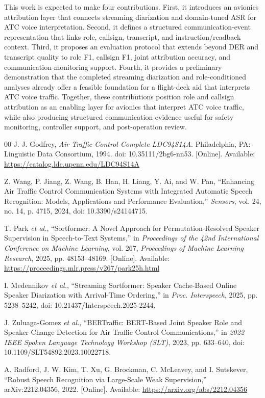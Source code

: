 \documentclass[10pt]{article}
\begin{document}
This work is expected to make four contributions. First, it introduces an avionics attribution layer that connects streaming diarization and domain-tuned ASR for ATC voice interpretation. Second, it defines a structured communication-event representation that links role, callsign, transcript, and instruction/readback context. Third, it proposes an evaluation protocol that extends beyond DER and transcript quality to role F1, callsign F1, joint attribution accuracy, and communication-monitoring support. Fourth, it provides a preliminary demonstration that the completed streaming diarization and role-conditioned analyses already offer a feasible foundation for a flight-deck aid that interprets ATC voice traffic. Together, these contributions position role and callsign attribution as an enabling layer for avionics that interpret ATC voice traffic, while also producing structured communication evidence useful for safety monitoring, controller support, and post-operation review.

\begingroup
\small
\begin{thebibliography}{00}
J. J. Godfrey, \emph{Air Traffic Control Complete LDC94S14A}. Philadelphia, PA: Linguistic Data Consortium, 1994. doi: 10.35111/2bg6-nn53. [Online]. Available: \url{https://catalog.ldc.upenn.edu/LDC94S14A}

Z. Wang, P. Jiang, Z. Wang, B. Han, H. Liang, Y. Ai, and W. Pan, ``Enhancing Air Traffic Control Communication Systems with Integrated Automatic Speech Recognition: Models, Applications and Performance Evaluation,'' \emph{Sensors}, vol. 24, no. 14, p. 4715, 2024, doi: 10.3390/s24144715.

T. Park \emph{et al.}, ``Sortformer: A Novel Approach for Permutation-Resolved Speaker Supervision in Speech-to-Text Systems,'' in \emph{Proceedings of the 42nd International Conference on Machine Learning}, vol. 267, \emph{Proceedings of Machine Learning Research}, 2025, pp. 48153--48169. [Online]. Available: \url{https://proceedings.mlr.press/v267/park25h.html}

I. Medennikov \emph{et al.}, ``Streaming Sortformer: Speaker Cache-Based Online Speaker Diarization with Arrival-Time Ordering,'' in \emph{Proc. Interspeech}, 2025, pp. 5238--5242, doi: 10.21437/Interspeech.2025-2244.

J. Zuluaga-Gomez \emph{et al.}, ``BERTraffic: BERT-Based Joint Speaker Role and Speaker Change Detection for Air Traffic Control Communications,'' in \emph{2022 IEEE Spoken Language Technology Workshop (SLT)}, 2023, pp. 633--640, doi: 10.1109/SLT54892.2023.10022718.

A. Radford, J. W. Kim, T. Xu, G. Brockman, C. McLeavey, and I. Sutskever, ``Robust Speech Recognition via Large-Scale Weak Supervision,'' arXiv:2212.04356, 2022. [Online]. Available: \url{https://arxiv.org/abs/2212.04356}
\end{thebibliography}
\endgroup
\end{document}
